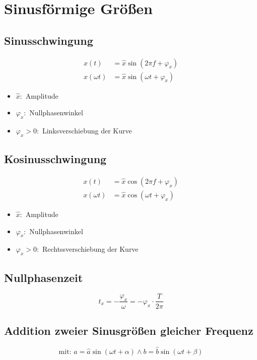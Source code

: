 \section{Sinusförmige Größen}
\begin{multicols}{2}{}
 \subsection{Sinusschwingung}
  \begin{align*}
   x\left(t\right) &= \hat{x} \sin\left( 2 \pi f + \varphi_x\right) \\
   x\left( \omega t \right) &= \hat{x} \sin\left( \omega t + \varphi_x\right)
  \end{align*}
  \begin{itemize}
   \item \(\hat{x} :\) Amplitude
   \item \(\varphi_x :\) Nullphasenwinkel
   \item \(\varphi_{x}>0 :\) Linksverschiebung der Kurve
  \end{itemize}

 \subsection{Kosinusschwingung}
  \begin{align*}
   x\left(t\right) &= \hat{x} \cos\left( 2 \pi f + \varphi_x\right) \\
   x\left( \omega t \right) &= \hat{x} \cos\left( \omega t + \varphi_x\right)
  \end{align*}
  \begin{itemize}
   \item \(\hat{x} :\) Amplitude
   \item \(\varphi_x :\) Nullphasenwinkel
   \item \(\varphi_{x}>0 :\) Rechtssverschiebung der Kurve
  \end{itemize}
\end{multicols}

\subsection{Nullphasenzeit}
\[ t_{x} = -\frac{\varphi_x}{\omega} = -\varphi_x \cdot \frac{T}{2 \pi} \]

\subsection{Addition zweier Sinusgrößen gleicher Frequenz}
\[\text{mit: } a = \hat{a} \sin \left( \omega t + \alpha \right) \wedge b = \hat{b} \sin \left( \omega t + \beta \right)\]

